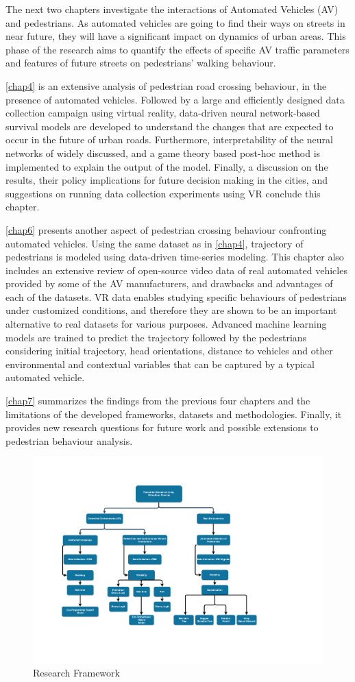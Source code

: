 The next two chapters investigate the interactions of Automated Vehicles (AV) and pedestrians. As automated vehicles are going to find their ways on streets in near future, they will have a significant impact on dynamics of urban areas. This phase of the research aims to quantify the effects of specific AV traffic parameters and features of future streets on pedestrians' walking behaviour.

\cref{chap4} is an extensive analysis of pedestrian road crossing behaviour, in the presence of automated vehicles. Followed by a large and efficiently designed data collection campaign using virtual reality, data-driven neural network-based survival models are developed to understand the changes that are expected to occur in the future of urban roads. Furthermore, interpretability of the neural networks of widely discussed, and a game theory based post-hoc method is implemented to explain the output of the model. Finally, a discussion on the results, their policy implications for future decision making in the cities, and suggestions on running data collection experiments using VR conclude this chapter.

\cref{chap6} presents another aspect of pedestrian crossing behaviour confronting automated vehicles. Using the same dataset as in \cref{chap4}, trajectory of pedestrians is modeled using data-driven time-series modeling. This chapter also includes an extensive review of open-source video data of real automated vehicles provided by some of the AV manufacturers, and drawbacks and advantages of each of the datasets. VR data enables studying specific behaviours of pedestrians under customized conditions, and therefore they are shown to be an important alternative to real datasets for various purposes. Advanced machine learning models are trained to predict the trajectory followed by the pedestrians considering initial trajectory, head orientations, distance to vehicles and other environmental and contextual variables that can be captured by a typical automated vehicle. 

\cref{chap7} summarizes the findings from the previous four chapters and the limitations of the developed frameworks, datasets and methodologies.
Finally, it provides new research questions for future work and possible extensions to pedestrian behaviour analysis.



\begin{figure}
  \centering
  \includegraphics[width=\textwidth,trim=1cm 2cm 3cm 2.5cm,clip]{chapter_1/figures/frame.pdf} %
  \caption{Research Framework}
  \label{fig: framework}
\end{figure}